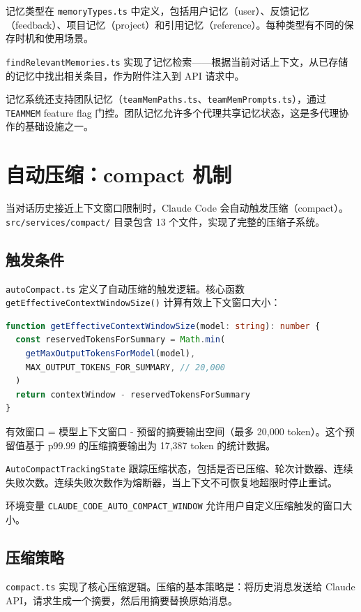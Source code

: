 记忆类型在 \texttt{memoryTypes.ts} 中定义，包括用户记忆（user）、反馈记忆（feedback）、项目记忆（project）和引用记忆（reference）。每种类型有不同的保存时机和使用场景。

\texttt{findRelevantMemories.ts} 实现了记忆检索——根据当前对话上下文，从已存储的记忆中找出相关条目，作为附件注入到 API 请求中。

记忆系统还支持团队记忆（\texttt{teamMemPaths.ts}、\texttt{teamMemPrompts.ts}），通过 \texttt{TEAMMEM} feature flag 门控。团队记忆允许多个代理共享记忆状态，这是多代理协作的基础设施之一。

\section{自动压缩：compact 机制}

当对话历史接近上下文窗口限制时，Claude Code 会自动触发压缩（compact）。\texttt{src/services/compact/} 目录包含 13 个文件，实现了完整的压缩子系统。

\subsection{触发条件}

\texttt{autoCompact.ts} 定义了自动压缩的触发逻辑。核心函数 \texttt{getEffectiveContextWindowSize()} 计算有效上下文窗口大小：

\begin{lstlisting}[language=TypeScript]
function getEffectiveContextWindowSize(model: string): number {
  const reservedTokensForSummary = Math.min(
    getMaxOutputTokensForModel(model),
    MAX_OUTPUT_TOKENS_FOR_SUMMARY, // 20,000
  )
  return contextWindow - reservedTokensForSummary
}
\end{lstlisting}

有效窗口 = 模型上下文窗口 - 预留的摘要输出空间（最多 20,000 token）。这个预留值基于 p99.99 的压缩摘要输出为 17,387 token 的统计数据。

\texttt{AutoCompactTrackingState} 跟踪压缩状态，包括是否已压缩、轮次计数器、连续失败次数。连续失败次数作为熔断器，当上下文不可恢复地超限时停止重试。

环境变量 \texttt{CLAUDE\_CODE\_AUTO\_COMPACT\_WINDOW} 允许用户自定义压缩触发的窗口大小。

\subsection{压缩策略}

\texttt{compact.ts} 实现了核心压缩逻辑。压缩的基本策略是：将历史消息发送给 Claude API，请求生成一个摘要，然后用摘要替换原始消息。

